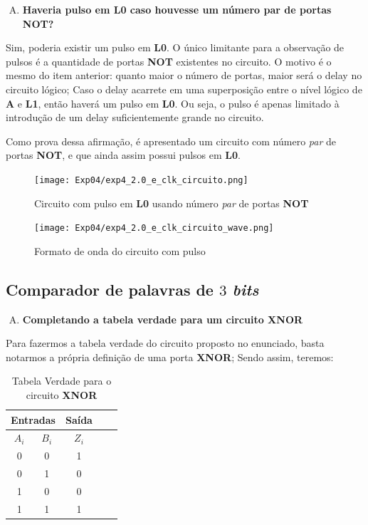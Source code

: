 \documentclass[12pt]{article}
\begin{document}
\begin{enumerate}[E)]
\item \textbf{Haveria pulso em L0 caso houvesse um número par de portas NOT?}
\end{enumerate}

Sim, poderia existir um pulso em \textbf{L0}. O único limitante para a observação
de pulsos é a quantidade de portas \textbf{NOT} existentes no circuito. O motivo
é o mesmo do item anterior: quanto maior o número de portas, maior será o delay
no circuito lógico; Caso o delay acarrete em uma superposição entre o nível
lógico de \textbf{A} e \textbf{L1}, então haverá um pulso em \textbf{L0}. Ou
seja, o pulso é apenas limitado à introdução de um delay suficientemente grande
no circuito.

Como prova dessa afirmação, é apresentado um circuito com número \emph{par} de
portas \textbf{NOT}, e que ainda assim possui pulsos em \textbf{L0}.

\begin{figure}[H]
    \centering
    \texttt{[image: Exp04/exp4\_2.0\_e\_clk\_circuito.png]}
    \caption{Circuito com pulso em \textbf{L0} usando número \emph{par} de portas \textbf{NOT}}\label{fig:exp4_2.0_e_clk_circuito.png}
\end{figure}

\begin{figure}[H]
    \centering
    \texttt{[image: Exp04/exp4\_2.0\_e\_clk\_circuito\_wave.png]}
    \caption{Formato de onda do circuito com pulso}\label{fig:exp4_2.0_e_clk_circuito_wave.png}
\end{figure}


\subsection{Comparador de palavras de \(3\) \emph{bits}}\label{sec:comparador_de_palavras_3_bits}

\begin{enumerate}[A)]
\item \textbf{Completando a tabela verdade para um circuito \textbf{XNOR}}
\end{enumerate}

Para fazermos a tabela verdade do circuito proposto no enunciado, basta notarmos
a própria definição de uma porta \textbf{XNOR}; Sendo assim, teremos:

\begin{table}[H]
    \centering
    \caption{Tabela Verdade para o circuito \textbf{XNOR}}
    \begin{tabular}{|c|c|c|c|c|}\hline
    \multicolumn{2}{|c|}{Entradas} & \multicolumn{1}{|c|}{Saída} \\\hline
    $A_{i}$ & $B_{i}$ & $Z_{i}$ \\\hline
    0 & 0 & 1 \\\hline
    0 & 1 & 0 \\\hline
    1 & 0 & 0 \\\hline
    1 & 1 & 1 \\\hline
    \end{tabular}\label{tab:comparador_de_palavras_3_bits}
\end{table}
\end{document}
